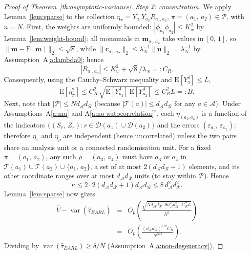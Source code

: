 \documentclass[sigconf]{acmart}
\newcommand{\E}{\mathrm E}
\DeclareMathOperator{\var}{var}
\begin{document}
\begin{proof}[Proof of Theorem~\ref{th:asymptotic-variance}]
    \emph{Step 2: concentration.} We apply Lemma~\ref{lem:sparse} to the collection $\eta_\pi = Y_{a_1}Y_{a_2}R_{a_1,a_2}$, $\pi=(a_1,\,a_2)\in\mathcal P$, with $n=N$. First, the weights are uniformly bounded: $|\phi_{a_1}\phi_{a_2}|\le K_w^2$ by Lemma~\ref{lem:weight-bound}; all monomials in $\mathbf m_{a_1,a_2}$ take values in $[0,\,1]$, so $\|\mathbf m - \E[\mathbf m]\|_2\le \sqrt 8$, while $\|\mathbf c_{a_1,a_2}\|_2 \le \lambda_N^{-1}\|\mathbf u\|_2=\lambda_N^{-1}$ by Assumption~A\ref{a:lambda0}; hence
    \begin{equation}\label{eq:CR}
        |R_{a_1,a_2}| \le K_w^2 + \sqrt 8/\lambda_N =: C_R.
    \end{equation}
    Consequently, using the Cauchy--Schwarz inequality and $\E[Y_a^4]\le L$,
    \begin{equation*}
        \E[\eta_\pi^2] \le C_R^2\,\sqrt{\E[Y_{a_1}^4]\,\E[Y_{a_2}^4]} \le C_R^2L =: B.
    \end{equation*}
    Next, note that $|\mathcal P| \le Nd_{\mathcal A}d_{\mathcal R}$ (because $|\mathcal T(a)|\le d_{\mathcal A}d_{\mathcal R}$ for any $a\in\mathcal A$). Under Assumptions~A\ref{a:mu} and A\ref{a:no-autocorrelation}$^*$, each $\eta_{(a_1,a_2)}$ is a function of the indicators $\{(S_r,\,Z_r)\colon r\in\mathcal D(a_1)\cup\mathcal D(a_2)\}$ and the errors $(\varepsilon_{a_1},\,\varepsilon_{a_2})$; therefore $\eta_\pi$ and $\eta_\rho$ are independent (hence uncorrelated) unless the two pairs share an analysis unit or a connected randomisation unit. For a fixed $\pi=(a_1,\,a_2)$, any such $\rho=(a_3,\,a_4)$ must have $a_3$ or $a_4$ in $\mathcal T(a_1)\cup\mathcal T(a_2)\cup\{a_1,\,a_2\}$, a set of at most $2(d_{\mathcal A}d_{\mathcal R}+1)$ elements, and its other coordinate ranges over at most $d_{\mathcal A}d_{\mathcal R}$ units (to stay within $\mathcal P$). Hence
    \begin{equation*}
        \kappa \le 2\cdot 2(d_{\mathcal A}d_{\mathcal R}+1)d_{\mathcal A}d_{\mathcal R}\le 8\,d^2_{\mathcal A}d^2_{\mathcal R}.
    \end{equation*}
    Lemma~\ref{lem:sparse} now gives
    \begin{eqnarray*}
        \hat V - \var(\hat\tau^{\phantom{1}}_{EARL}) &=& O_p\left(\frac{\sqrt{Nd_{\mathcal A}d_{\mathcal R}\cdot 8d^2_{\mathcal A}d^2_{\mathcal R}\cdot C_R^2L}}{N^2}\right)\\ &=& O_p\left(\frac{(d_{\mathcal A}d_{\mathcal R})^{3/2}C_R}{N^{3/2}}\right).
    \end{eqnarray*}
    Dividing by $\var(\hat\tau_{EARL})\ge\delta/N$ (Assumption~A\ref{a:non-degeneracy}),

\end{proof}
\end{document}
